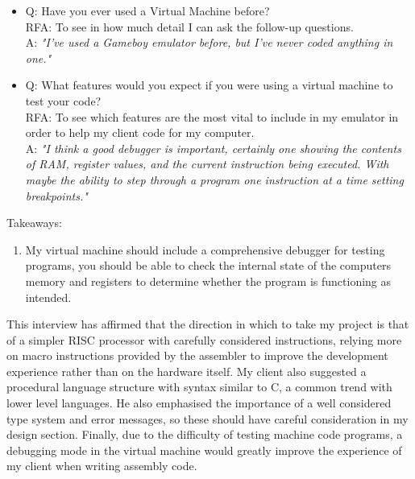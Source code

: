 \begin{enumerate}
\begin{itemize}
            \item Q: Have you ever used a Virtual Machine before? \\
                RFA: To see in how much detail I can ask the follow-up questions.\\
                A: \textit{"I've used a Gameboy emulator before, but I've never coded anything in one."}
            \item Q: What features would you expect if you were using a virtual machine to test your code? \\
                RFA: To see which features are the most vital to include in my emulator in order to help my client code for my computer.\\
                A: \textit{"I think a good debugger is important, certainly one showing the contents of RAM, register values, and the current instruction being executed. With maybe the ability to step through a program one instruction at a time setting breakpoints."}
        \end{itemize}
        Takeaways:
        \begin{enumerate}
            \item My virtual machine should include a comprehensive debugger for testing programs, you should be able to check the internal state of the computers memory and registers to determine whether the program is functioning as intended.
        \end{enumerate}
\end{enumerate}

This interview has affirmed that the direction in which to take my project is that of a simpler RISC processor with carefully considered instructions, relying more on macro instructions provided by the assembler to improve the development experience rather than on the hardware itself. My client also suggested a procedural language structure with syntax similar to C, a common trend with lower level languages. He also emphasised the importance of a well considered type system and error messages, so these should have careful consideration in my design section. Finally, due to the difficulty of testing machine code programs, a debugging mode in the virtual machine would greatly improve the experience of my client when writing assembly code.